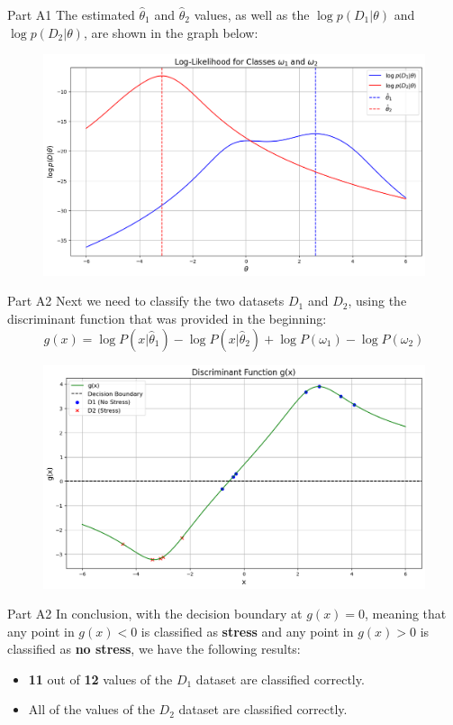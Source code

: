 \documentclass{beamer}
\begin{document}
    \begin{frame}{Part A1}
    The estimated $\hat{\theta}_1$ and $\hat{\theta}_2$ values, as well as the $\log{p(D_1 | \theta)}$ and $\log{p(D_2 | \theta)}$, are shown in the graph below:
    \begin{figure}
        \centering
        \includegraphics[width=0.75\linewidth]{A1.png}
        \label{Graph A1}
    \end{figure}
    \end{frame}

    \begin{frame}{Part A2}
    Next we need to classify the two datasets $D_1$ and $D_2$, using the discriminant function that was provided in the beginning:
    \[
    g(x) = \log{P(x|\hat{\theta}_1)} - \log{P(x|\hat{\theta}_2)} + \log{P(\omega_1)} - \log{P(\omega_2)}
    \]
    \begin{figure}
        \centering
        \includegraphics[width=0.75\linewidth]{A2.png}
        \label{Graph A2}
    \end{figure}
    \end{frame}

    \begin{frame}{Part A2}
    In conclusion, with the decision boundary at \textbf{$g(x) = 0$}, meaning that any point in $g(x) < 0$ is classified 
    as \textbf{stress} and any point in $g(x) > 0$ is classified as \textbf{no stress}, we have the following results:
    \begin{itemize}
        \item \textbf{11} out of \textbf{12} values of the $D_1$ dataset are classified correctly.
        \item All of the values of the $D_2$ dataset are classified correctly.
    \end{itemize}
    \end{frame}
\end{document}
